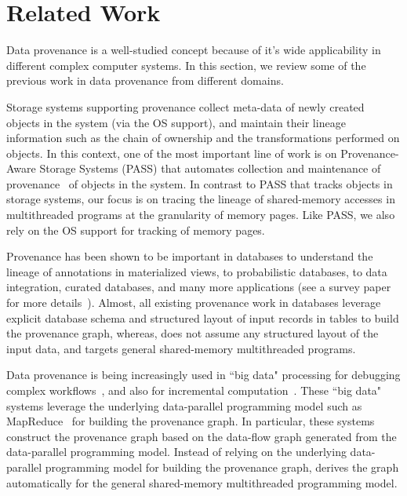 \section{Related Work}
\label{sec:related}

Data provenance is a well-studied concept because of it's wide applicability in different complex computer systems. In this section, we review some of the previous work in data provenance from different domains.



 Storage systems supporting provenance collect meta-data of newly created objects in the system (via the OS support), and  maintain their lineage information such as the chain of ownership and the transformations performed on objects. In this context, one of the most important line of work is on Provenance-Aware Storage Systems (PASS) that automates collection and maintenance of provenance~\cite{pass-atc} of objects in the system. %
In contrast to PASS that tracks objects in storage systems, our focus is on tracing the lineage of shared-memory accesses in multithreaded programs at the granularity of memory pages. Like PASS, we also rely on the OS support for tracking of memory pages.


 Provenance has been shown to be important in databases to understand the lineage of annotations in materialized views,  to probabilistic databases, to data integration, curated databases, and many more applications (see a survey paper for more details~\cite{provenance-database-tutorial}). Almost, all existing provenance work in databases leverage explicit database schema and structured layout of input records in tables to build the provenance graph, whereas, \projecttitle does not assume any structured layout of the input data, and targets general shared-memory multithreaded programs.

 
 Data provenance is being increasingly used in ``big data"  processing for  debugging complex workflows~\cite{nova}, and also for incremental computation~\cite{incoop}.  These ``big data" systems leverage the underlying data-parallel programming model such as MapReduce~\cite{mapreduce} for building the provenance graph. In particular, these systems construct the provenance graph based on the data-flow graph generated from the data-parallel programming model. Instead of relying on the underlying data-parallel programming model for building the provenance graph,  \projecttitle derives the graph automatically for the general shared-memory multithreaded programming model. 


